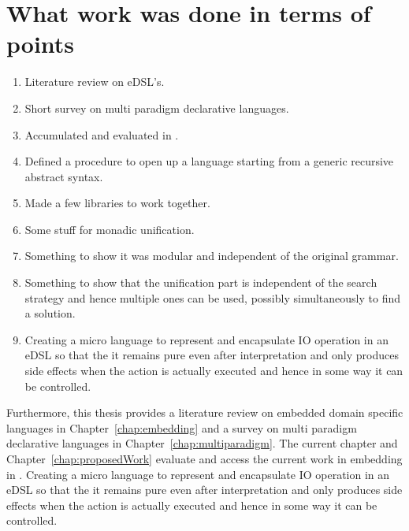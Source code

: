 \documentclass[thesis-solanki.tex]{subfiles}
\begin{document}
\section{What work was done in terms of points}\label{sec:work-in-points}
\begin{enumerate}
\item Literature review on eDSL's.

\item Short survey on multi paradigm declarative languages.

\item Accumulated and evaluated  in .

\item Defined a procedure to open up a language starting from a generic recursive abstract syntax.

\item Made a few libraries to work together.

\item Some stuff for monadic unification.

\item Something to show it was modular and independent of the original grammar.

\item
  Something to show that the unification part is independent of the search strategy and hence multiple ones can be
  used, possibly simultaneously to find a solution.

\item
  Creating a micro language to represent and encapsulate IO operation in an eDSL so that the it remains pure even
  after interpretation and only produces side effects when the action is actually executed and hence in some way it
  can be controlled.

\end{enumerate}

Furthermore, this thesis provides a literature review on embedded domain specific languages in Chapter~\ref{chap:embedding} and a survey on
multi paradigm declarative languages in Chapter~\ref{chap:multiparadigm}. The current chapter and Chapter~\ref{chap:proposedWork} evaluate 
and access the current work in embedding  in .  Creating a micro language to represent and encapsulate 
IO operation in an eDSL so that the it remains pure even after interpretation and only produces side effects when the action is actually 
executed and hence in some way it can be controlled.
\end{document}
